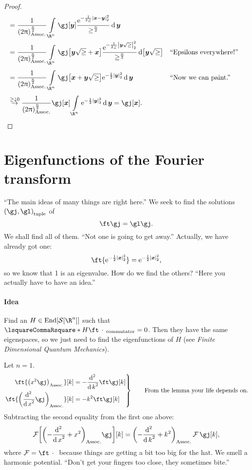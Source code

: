 \documentclass[10pt]{article}
\newcommand{\Rn}{{\R^n}}
\newcommand{\Schwartz}{{\SchwartzSpace\of{\Rn}}}
\newcommand{\ftnrm}{\frac{1}{\pa{2\Pi}^\frac{n}{2}} }
\begin{document}
\begin{proposition}
\begin{proof}
\begin{align*}
        &=\ftnrm\int\Rn\gj\of\vy\frac{\E^{-\frac{1}{2\ge}\norm{\vx-\vy}^2}}
        {\ge^\frac{n}{2}}\diffd\vy \\
        &=\ftnrm\int\Rn\gj\of{\vy\sqrt\ge+\vx}\frac{\E^{-\frac{1}{2\ge}\norm{\vy\sqrt\ge}^2}}
        {\ge^\frac{n}{2}}\diffd\of{\vy\sqrt\ge} && \text{``Epsilons everywhere!''}\\    
        &=\ftnrm\int\Rn\gj\of{\vx+\vy\sqrt\ge}\E^{-\frac{1}{2}\norm\vy^2}\diffd\vy
        && \text{``Now we can paint.''}\\
        &\overset{\ge\downarrow 0}{\rightarrow}
        \ftnrm\gj\of\vx\int\Rn\E^{-\frac{1}{2}\norm\vy^2}\diffd\vy =\gj\of\vx.
      \end{align*}
    \end{proof}
  \end{proposition}
  
  \section{Eigenfunctions of the Fourier transform}
  ``The main ideas of many things are right here.''
  We seek to find the solutions $\tuple{\gj,\gl}$ of
  \begin{equation*}
    \ft\gj=\gl\gj .
  \end{equation*}
  We shall find all of them. ``Not one is going to get away.'' Actually, we have already got one:
  \begin{equation*}
    \ft{\E^{-\frac{1}{2}\norm\vx^2}}=\E^{-\frac{1}{2}\norm\vx^2},
  \end{equation*}
  so we know that 1 is an eigenvalue. How do we find the others? ``Here you actually have to have an idea.''
  
  \paragraph{Idea}
  Find an $H\in\Endomorphisms\of\Schwartz$ such that $\commutator H {\ft\placeholder} = 0$. Then they have the same eigenspaces, so we just need to find the eigenfunctions of $H$ (see \emph{Finite Dimensional Quantum Mechanics}).
  
  Let $n=1$.
  \begin{equation*}
    \left.
    \begin{aligned}
      \ft{\pa{x^2\gj}}\of k &= -\derivop[2]{k}\ft\gj\of k \\
      \ft{\pa{\derivop[2]{x}\gj}}\of k &= -k^2 \ft\gj\of k
    \end{aligned}
    \right\rbrace \qquad \text{From the lemma your life depends on.}
  \end{equation*}
  Subtracting the second equality from the first one above:
  \begin{equation*}
    \FT\of{\pa{-\derivop[2]{x}+x^2}\gj}\of k = \pa{-\derivop[2]{k}+k^2}\FT\gj\of k,
  \end{equation*}
  where $\FT = \ft\placeholder$ because things are getting a bit too big for the hat.
  We smell a harmonic potential. ``Don't get your fingers too close, they sometimes bite.''
  
\end{document}
